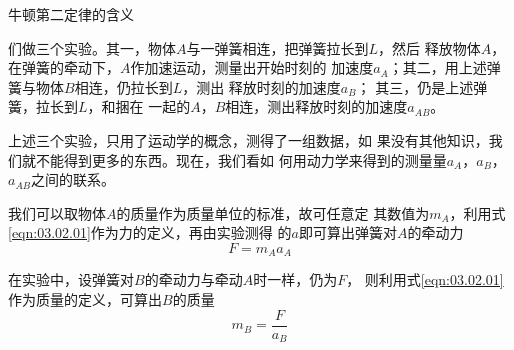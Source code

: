 \begin{figurex}[!h]
  \centering
  \hfill
  \hfill
  \hfill
  \hfill
  \caption{牛顿第二定律的含义}
  \label{fig:03.02}
\end{figurex}
\clearpage
\noindent 们做三个实验。其一，物体$ A $与一弹簧相连，把弹簧拉长到$ L $，然后
释放物体$ A $，在弹簧的牵动下，$ A $作加速运动，测量出开始时刻的
加速度$ a_A $；其二，用上述弹簧与物体$ B $相连，仍拉长到$ L $，测出
释放时刻的加速度$  a _ { B  } $；  其三，仍是上述弹簧，拉长到$ L $，和捆在
一起的$ A $，$ B $相连，测出释放时刻的加速度$  a _ { A B }  $。

上述三个实验，只用了运动学的概念，测得了一组数据，如
果没有其他知识，我们就不能得到更多的东西。现在，我们看如
何用动力学来得到的测量量$ a_A $，$ a_B $，$ a_{AB} $之间的联系。

我们可以取物体$ A $的质量作为质量单位的标准，故可任意定
其数值为$ m_A $，利用式\eqref{eqn:03.02.01}作为力的定义，再由实验测得
的$ a $即可算出弹簧对$ A $的牵动力
\begin{equation}\label{eqn:03.02.02}
  F = m _ { A } a _ { A }
\end{equation}

在实验中，设弹簧对$ B $的牵动力与牵动$ A $时一样，仍为$ F $，
则利用式\eqref{eqn:03.02.01}作为质量的定义，可算出$ B $的质量
\begin{equation}\label{eqn:03.02.03}
  m _ { B } = \frac { F } { a _ { B } }
\end{equation}

